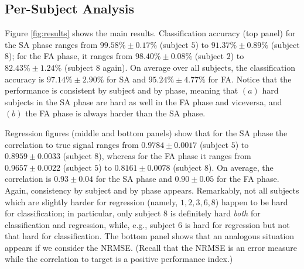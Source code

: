 \documentclass[10pt]{bmc_article}
\def\texttt{[image: ]}
\newenvironment{bmcformat}
  {\begin{raggedright}\baselineskip20pt\sloppy\setboolean{publ}{false}}
  {\end{raggedright}\baselineskip20pt\sloppy}
\begin{document}
\begin{bmcformat}
\subsection*{Per-Subject Analysis}


Figure \ref{fig:results} shows the main results. Classification
accuracy (top panel) for the SA phase ranges
from $99.58\% \pm 0.17\%$ (subject $5$) to $91.37\% \pm 0.89\%$ (subject $8$);
for the FA phase, it ranges
from $98.40\% \pm 0.08\%$ (subject $2$) to $82.43\% \pm 1.24\%$ (subject $8$ again).
On average over all subjects, the classification accuracy is
$97.14\% \pm 2.90\%$ for SA and $95.24\% \pm 4.77\%$ for FA.
Notice that the performance is
consistent by subject and by phase, meaning that $(a)$ hard subjects
in the SA phase are hard as well in the FA phase and viceversa, and
$(b)$ the FA phase is always harder than the SA phase.

Regression figures (middle and bottom panels) show that for the SA phase
the correlation to true signal ranges from
$0.9784 \pm 0.0017$ (subject $5$) to $0.8959 \pm 0.0033$ (subject $8$),
whereas for the FA phase it ranges from
$0.9657 \pm 0.0022$ (subject $5$) to $0.8161 \pm 0.0078$ (subject $8$).
On average, the correlation is $0.93 \pm 0.04$ for the SA phase and
$0.90 \pm 0.05$ for the FA phase. Again, consistency by subject and by
phase appears. Remarkably,
not all subjects which are slightly harder for regression (namely,
$1,2,3,6,8$) happen to be hard for classification; in particular, only
subject $8$ is definitely hard \emph{both} for classification and
regression, while, e.g., subject $6$ is hard for regression but not
that hard for classification. The bottom panel shows that an analogous
situation appears if we consider the NRMSE. (Recall that the NRMSE is
an error measure while the correlation to target is a positive performance
index.)


\end{bmcformat}
\end{document}
